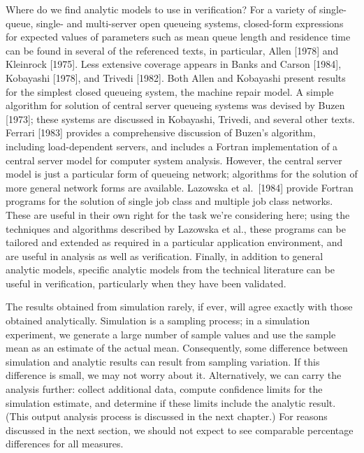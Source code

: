 Where do we find analytic models to use in verification? For a variety of
single-queue, single- and multi-server open queueing systems, closed-form
expressions for expected values of parameters such as mean queue length and
\noindent residence time can be found in several of the referenced texts, in particular,
Allen [1978] and Kleinrock [1975]. Less extensive coverage appears in Banks
and Carson [1984], Kobayashi [1978], and Trivedi [1982]. Both Allen and
Kobayashi present results for the simplest closed queueing system, the machine
repair model. A simple algorithm for solution of central server queueing
systems was devised by Buzen [1973]; these systems are discussed in Kobayashi,
Trivedi, and several other texts. Ferrari [1983] provides a comprehensive
discussion of Buzen's algorithm, including load-dependent servers, and
includes a Fortran implementation of a central server model for computer
system analysis. However, the central server model is just a particular form
of queueing network; algorithms for the solution of more general network forms
are available. Lazowska et al.\ [1984] provide Fortran programs for the
solution of single job class and multiple job class networks. These are useful
in their own right for the task we're considering here; using the techniques
and algorithms described by Lazowska et al., these programs can be tailored
and extended as required in a particular application environment, and are
useful in analysis as well as verification. Finally, in addition to general
analytic models, specific analytic models from the technical literature can be
useful in verification, particularly when they have been validated.

The results obtained from simulation rarely, if ever, will agree exactly with
those obtained analytically. Simulation is a sampling process; in a simulation
experiment, we generate a large number of sample values and use the sample
mean as an estimate of the actual mean. Consequently, some difference between
simulation and analytic results can result from sampling variation. If this
 difference is small, we may not worry about it. Alternatively, we can carry
the analysis further: collect additional data, compute confidence limits for
the simulation estimate, and determine if these limits include the analytic
result. (This output analysis process is discussed in the next chapter.) For
reasons discussed in the next section, we should not expect to see comparable
percentage differences for all measures.

